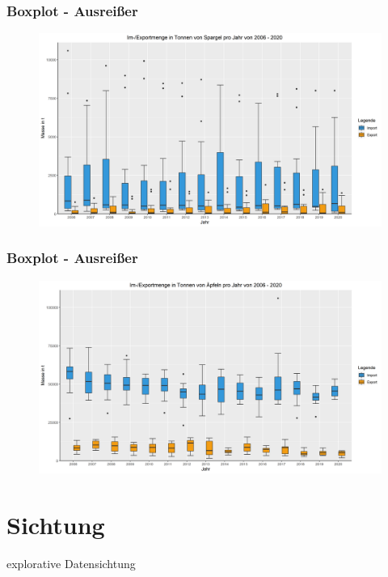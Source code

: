 \documentclass{beamer}
\begin{document}
\begin{frame}
	\frametitle{Boxplot - Ausreißer}
	\begin{figure}[b]
		\centering
		\includegraphics[scale=0.35]{Marco_6_Folie_1}
	\end{figure}
\end{frame}

\begin{frame}
	\frametitle{Boxplot - Ausreißer}
	\begin{figure}[b]
		\centering
		\includegraphics[scale=0.35]{Marco_6_Folie_2}
	\end{figure}
\end{frame}

\section{Sichtung}
\begin{frame}
	\begin{center}
		{\Huge explorative Datensichtung}
	\end{center}
\end{frame}
\end{document}
